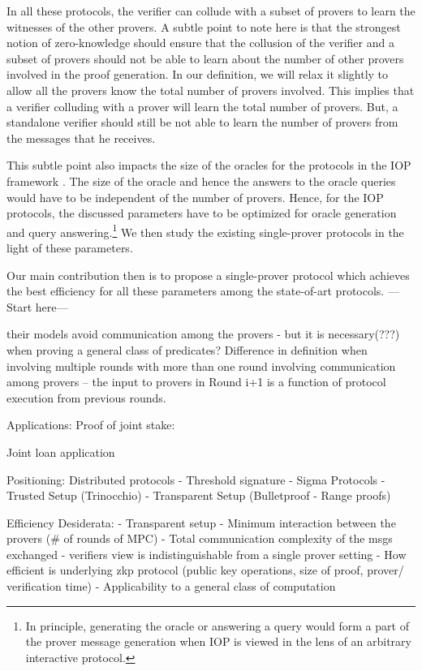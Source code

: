 In all these protocols, the verifier can collude with a subset of provers to learn the witnesses of the other provers. A subtle point to note here is that the strongest notion of zero-knowledge should ensure that the collusion of the verifier and a subset of provers should not be able to learn about the number of other provers involved in the proof generation.  In our definition, we will relax it slightly to allow all the provers know the total number of provers involved. This implies that a verifier colluding with a prover will learn the total number of provers. But, a standalone verifier should still be not able to learn the number of provers from the messages that he receives.

This subtle point also impacts the size of the oracles for the protocols in the IOP framework \cite{aurora, ligero}. The size of the oracle and hence the answers to the oracle queries would have to be independent of the number of provers. Hence, for the IOP protocols, the discussed parameters have to be optimized for oracle generation and query answering.\footnote{In principle, generating the oracle or answering a query  would form a part of the prover message generation when IOP is viewed in the lens of an arbitrary interactive protocol.}
We then study the existing single-prover protocols in the light of these parameters. 

Our main contribution then is to propose a single-prover protocol which achieves the best efficiency for all these parameters among the state-of-art protocols. ---Start here---


their models avoid communication among the provers - but it is necessary(???) when proving a general class of predicates?
Difference in definition when involving multiple rounds with more than one round involving communication among provers -- the input to provers in Round i+1 is a function of protocol execution from previous rounds.


Applications: 
Proof of joint stake: 

Joint loan application


Positioning:  Distributed protocols
- Threshold signature
- Sigma Protocols
- Trusted Setup (Trinocchio)
- Transparent Setup (Bulletproof - Range proofs)

Efficiency Desiderata:  
- Transparent setup 
- Minimum interaction between the provers (\# of rounds of MPC) 
- Total communication complexity of the msgs exchanged
- verifiers view is indistinguishable from a single prover setting
- How efficient is underlying zkp protocol (public key operations, size of proof, prover/ verification time)
- Applicability to a general class of computation






